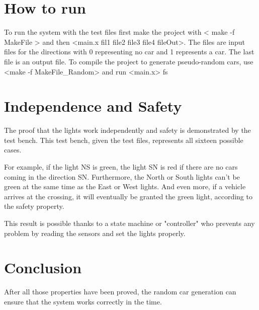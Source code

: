 
\section{How to run}
To run the system with the test files first make the project with < make -f MakeFile > and then <main.x fil1 file2 file3 file4 fileOut>. The files are input files for the directions with 0 representing no car and 1 represents a car. The last file is an output file. To compile the project to generate pseudo-random cars, use <make -f MakeFile_Random> and run <main.x> fs

\section{Independence and Safety}

The proof that the lights work independently and safety is demonstrated by the test bench. This test bench, given the test files, represents all sixteen possible cases.

For example, if the light NS is green, the light SN is red if there are no cars coming in the direction SN.
Furthermore, the North or South lights can't be green at the same time as the East or West lights.
And even more, if a vehicle arrives at the crossing, it will eventually be granted the green light, according to the safety property.

This result is possible thanks to a state machine or "controller" who prevents any problem by reading the sensors and set the lights properly. 

\section{Conclusion}

After all those properties have been proved, the random car generation can ensure that the system works correctly in the time. 
